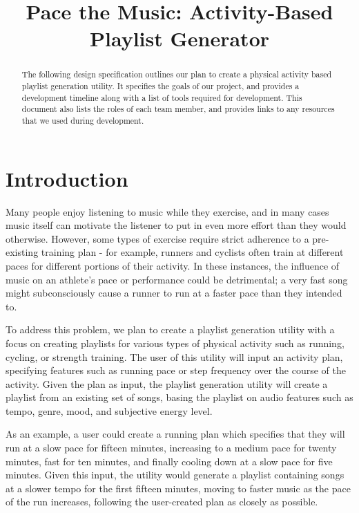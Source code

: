 \documentclass{article}
\title{Pace the Music: Activity-Based Playlist Generator}
\begin{document}
%
\maketitle
%
\begin{abstract}
The following design specification outlines our plan to create a physical activity based playlist generation utility. It specifies the goals of our project, and provides a development timeline along with a list of tools required for development. This document also lists the roles of each team member, and provides links to any resources that we used during development.
\end{abstract}

\section{Introduction}
Many people enjoy listening to music while they exercise, and in many cases music itself can motivate the listener to put in even more effort than they would otherwise. \cite{Shivar} However, some types of exercise require strict adherence to a pre-existing training plan - for example, runners and cyclists often train at different paces for different portions of their activity. In these instances, the influence of music on an athlete's pace or performance could be detrimental; a very fast song might subconsciously cause a runner to run at a faster pace than they intended to.

To address this problem, we plan to create a playlist generation utility with a focus on creating playlists for various types of physical activity such as running, cycling, or strength training. The user of this utility will input an activity plan, specifying features such as running pace or step frequency over the course of the activity. Given the plan as input, the playlist generation utility will create a playlist from an existing set of songs, basing the playlist on audio features such as tempo, genre, mood, and subjective energy level.

As an example, a user could create a running plan which specifies that they will run at a slow pace for fifteen minutes, increasing to a medium pace for twenty minutes, fast for ten minutes, and finally cooling down at a slow pace for five minutes. Given this input, the utility would generate a playlist containing songs at a slower tempo for the first fifteen minutes, moving to faster music as the pace of the run increases, following the user-created plan as closely as possible.
\end{document}

